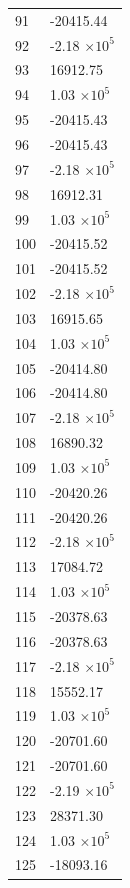\documentclass[a4paper,11pt]{article}
\begin{document}
\begin{center}
\begin{longtable}{|R{1.5cm}|R{2.5cm}|}
   91 &    -20415.44 \\
   92 &        -2.18 $\times 10^{           5}$ \\
   93 &     16912.75 \\
   94 &         1.03 $\times 10^{           5}$ \\
   95 &    -20415.43 \\
   96 &    -20415.43 \\
   97 &        -2.18 $\times 10^{           5}$ \\
   98 &     16912.31 \\
   99 &         1.03 $\times 10^{           5}$ \\
  100 &    -20415.52 \\
  101 &    -20415.52 \\
  102 &        -2.18 $\times 10^{           5}$ \\
  103 &     16915.65 \\
  104 &         1.03 $\times 10^{           5}$ \\
  105 &    -20414.80 \\
  106 &    -20414.80 \\
  107 &        -2.18 $\times 10^{           5}$ \\
  108 &     16890.32 \\
  109 &         1.03 $\times 10^{           5}$ \\
  110 &    -20420.26 \\
  111 &    -20420.26 \\
  112 &        -2.18 $\times 10^{           5}$ \\
  113 &     17084.72 \\
  114 &         1.03 $\times 10^{           5}$ \\
  115 &    -20378.63 \\
  116 &    -20378.63 \\
  117 &        -2.18 $\times 10^{           5}$ \\
  118 &     15552.17 \\
  119 &         1.03 $\times 10^{           5}$ \\
  120 &    -20701.60 \\
  121 &    -20701.60 \\
  122 &        -2.19 $\times 10^{           5}$ \\
  123 &     28371.30 \\
  124 &         1.03 $\times 10^{           5}$ \\
  125 &    -18093.16 \\

\end{longtable}
\end{center}
\end{document}

